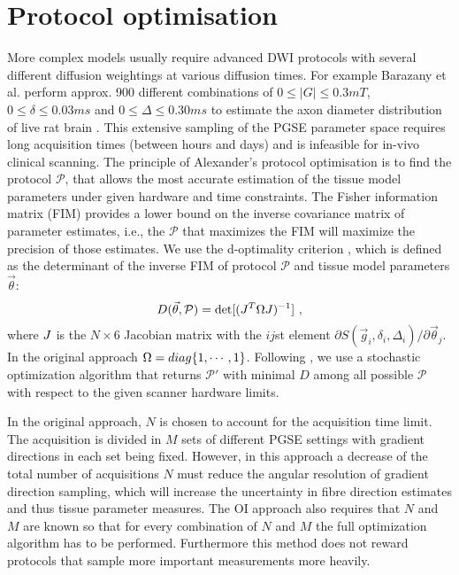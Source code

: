 \section{Protocol optimisation}
More complex models usually require advanced DWI protocols with several different diffusion weightings at various diffusion times. For example Barazany et al.\cite{assaf08} perform approx. 900 different combinations of $0\le|G|\le 0.3mT$, $0\le \delta \le 0.03ms$ and $0\le \Delta \le 0.30ms$ to estimate the axon diameter distribution of live rat brain \cite{TODO}. This extensive sampling of the PGSE parameter space requires long acquisition times (between hours and days) and is infeasible for in-vivo clinical scanning. The principle of Alexander's \cite{alexander2008} protocol optimisation is to find the protocol $\mathcal{P}$, that allows the most accurate estimation of the tissue model parameters under given hardware and time constraints. The Fisher information matrix (FIM) provides a lower bound on the inverse covariance matrix of parameter estimates, i.e., the $\mathcal{P}$ that maximizes the FIM will maximize the precision of those estimates. We use the d-optimality criterion \cite{obrien2003}, which is defined as the determinant of the inverse FIM of protocol $\mathcal{P}$ and tissue model parameters $\vec{\theta}$:
\begin{equation}
	D(\vec{\theta},\mathcal{P})=\det[(J^T\Omega J)^{-1}]~, 
	\label{eq-optimality}
\end{equation}
where $J$ is the $N\times6$ Jacobian matrix with the $ij$st element $\partial S(\vec{g}_i,\delta_i,\Delta_i) / \partial \vec{\theta}_j$. In the original approach $\Omega=diag\{1,\cdots,1\}$. Following \cite{alexander2008}, we use a stochastic optimization algorithm \cite{zelinka2000} that returns $\mathcal{P}'$ with minimal $D$ among all possible $\mathcal{P}$ with respect to the given scanner hardware limits.

In the original approach, $N$ is chosen to account for the acquisition time limit. The acquisition is divided in $M$ sets of different PGSE settings with gradient directions in each set being fixed. However, in this approach a decrease of the total number of acquisitions $N$ must reduce the angular resolution of gradient direction sampling, which will increase the uncertainty in fibre direction estimates and thus tissue parameter measures. The OI approach also requires that $N$ and $M$ are known so that for every combination of $N$ and $M$ the full optimization algorithm has to be performed. Furthermore this method does not reward protocols that sample more important measurements more heavily.